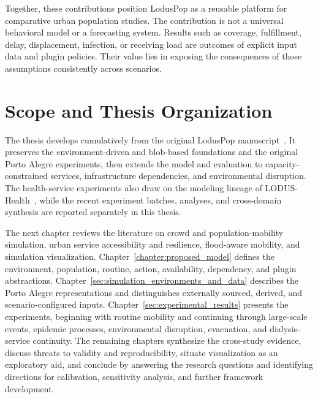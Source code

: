 Together, these contributions position LodusPop as a reusable platform for comparative urban population studies. The contribution is not a universal behavioral model or a forecasting system. Results such as coverage, fulfillment, delay, displacement, infection, or receiving load are outcomes of explicit input data and plugin policies. Their value lies in exposing the consequences of those assumptions consistently across scenarios.

\section{Scope and Thesis Organization}
\label{sec:introduction_organization}

The thesis develops cumulatively from the original LodusPop manuscript~\cite{silva2026lodusPop}. It preserves the environment-driven and blob-based foundations and the original Porto Alegre experiments, then extends the model and evaluation to capacity-constrained services, infrastructure dependencies, and environmental disruption. The health-service experiments also draw on the modeling lineage of LODUS-Health~\cite{souza2026lodushealth}, while the recent experiment batches, analyses, and cross-domain synthesis are reported separately in this thesis.

The next chapter reviews the literature on crowd and population-mobility simulation, urban service accessibility and resilience, flood-aware mobility, and simulation visualization. Chapter~\ref{chapter:proposed_model} defines the environment, population, routine, action, availability, dependency, and plugin abstractions. Chapter~\ref{sec:simulation_environments_and_data} describes the Porto Alegre representations and distinguishes externally sourced, derived, and scenario-configured inputs. Chapter~\ref{sec:experimental_results} presents the experiments, beginning with routine mobility and continuing through large-scale events, epidemic processes, environmental disruption, evacuation, and dialysis-service continuity. The remaining chapters synthesize the cross-study evidence, discuss threats to validity and reproducibility, situate visualization as an exploratory aid, and conclude by answering the research questions and identifying directions for calibration, sensitivity analysis, and further framework development.
